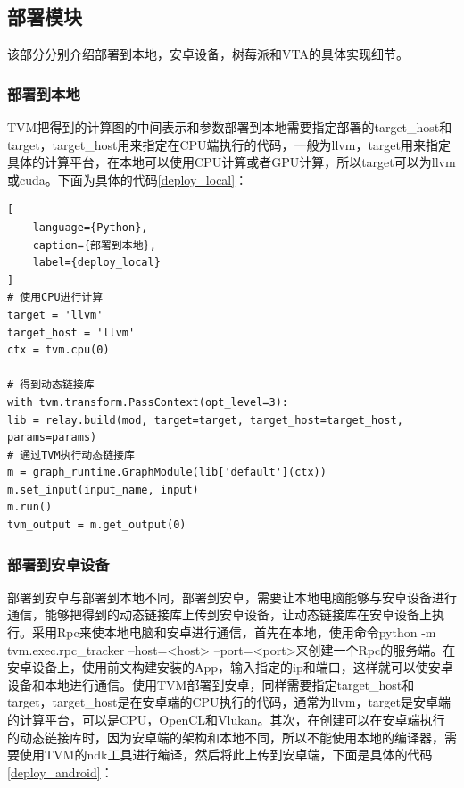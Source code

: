 \subsection{部署模块}

该部分分别介绍部署到本地，安卓设备，树莓派和VTA的具体实现细节。


\subsubsection{部署到本地}

TVM把得到的计算图的中间表示和参数部署到本地需要指定部署的target\_host和target，target\_host用来指定在CPU端执行的代码，一般为llvm，target用来指定具体的计算平台，在本地可以使用CPU计算或者GPU计算，所以target可以为llvm或cuda。下面为具体的代码\ref{deploy_local}：

\begin{lstlisting}[
    language={Python},
    caption={部署到本地},
    label={deploy_local}
]
# 使用CPU进行计算
target = 'llvm'
target_host = 'llvm'
ctx = tvm.cpu(0)

# 得到动态链接库
with tvm.transform.PassContext(opt_level=3):
lib = relay.build(mod, target=target, target_host=target_host, params=params)
# 通过TVM执行动态链接库
m = graph_runtime.GraphModule(lib['default'](ctx))
m.set_input(input_name, input)
m.run()
tvm_output = m.get_output(0)
\end{lstlisting}


\subsubsection{部署到安卓设备}

部署到安卓与部署到本地不同，部署到安卓，需要让本地电脑能够与安卓设备进行通信，能够把得到的动态链接库上传到安卓设备，让动态链接库在安卓设备上执行。采用Rpc来使本地电脑和安卓进行通信，首先在本地，使用命令python -m tvm.exec.rpc\_tracker --host=<host> --port=<port>来创建一个Rpc的服务端。在安卓设备上，使用前文构建安装的App，输入指定的ip和端口，这样就可以使安卓设备和本地进行通信。使用TVM部署到安卓，同样需要指定target\_host和target，target\_host是在安卓端的CPU执行的代码，通常为llvm，target是安卓端的计算平台，可以是CPU，OpenCL和Vlukan。其次，在创建可以在安卓端执行的动态链接库时，因为安卓端的架构和本地不同，所以不能使用本地的编译器，需要使用TVM的ndk工具进行编译，然后将此上传到安卓端，下面是具体的代码\ref{deploy_android}：

